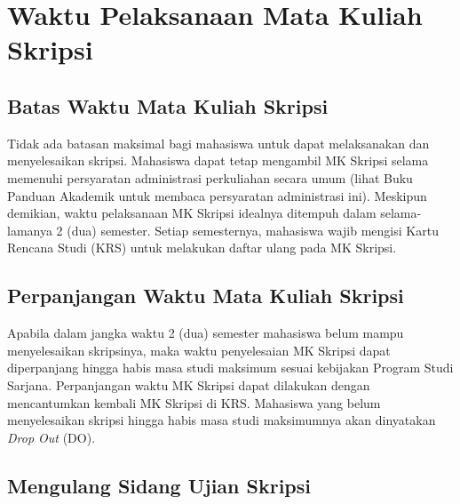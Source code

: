 \documentclass[
  indonesian,
  letterpaper,
]{scrbook}
\begin{document}
\section{Waktu Pelaksanaan Mata Kuliah
Skripsi}\label{waktu-pelaksanaan-mata-kuliah-skripsi}

\subsection*{Batas Waktu Mata Kuliah
Skripsi}\label{batas-waktu-mata-kuliah-skripsi}

Tidak ada batasan maksimal bagi mahasiswa untuk dapat melaksanakan dan
menyelesaikan skripsi. Mahasiswa dapat tetap mengambil MK Skripsi selama
memenuhi persyaratan administrasi perkuliahan secara umum (lihat Buku
Panduan Akademik untuk membaca persyaratan administrasi ini). Meskipun
demikian, waktu pelaksanaan MK Skripsi idealnya ditempuh dalam
selama-lamanya 2 (dua) semester. Setiap semesternya, mahasiswa wajib
mengisi Kartu Rencana Studi (KRS) untuk melakukan daftar ulang pada MK
Skripsi.

\subsection*{Perpanjangan Waktu Mata Kuliah
Skripsi}\label{perpanjangan-waktu-mata-kuliah-skripsi}

Apabila dalam jangka waktu 2 (dua) semester mahasiswa belum mampu
menyelesaikan skripsinya, maka waktu penyelesaian MK Skripsi dapat
diperpanjang hingga habis masa studi maksimum sesuai kebijakan Program
Studi Sarjana. Perpanjangan waktu MK Skripsi dapat dilakukan dengan
mencantumkan kembali MK Skripsi di KRS. Mahasiswa yang belum
menyelesaikan skripsi hingga habis masa studi maksimumnya akan
dinyatakan \emph{Drop Out} (DO).

\subsection*{Mengulang Sidang Ujian
Skripsi}\label{mengulang-sidang-ujian-skripsi}
\end{document}
